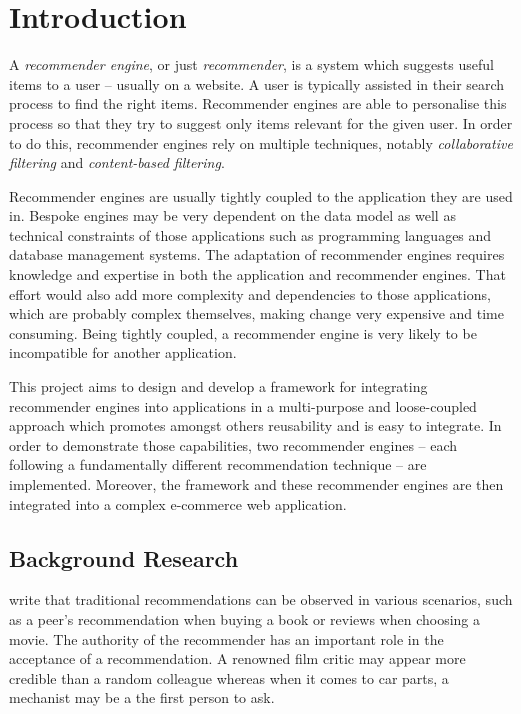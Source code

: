 \chapter{Introduction}

A \emph{recommender engine}, or just \emph{recommender}, is a system which suggests useful items to a user -- usually on a website. A user is typically assisted in their search process to find the right items. Recommender engines are able to personalise this process so that they try to suggest only items relevant for the given user. In order to do this, recommender engines rely on multiple techniques, notably \emph{collaborative filtering} and \emph{content-based filtering}.

Recommender engines are usually tightly coupled to the application they are used in. Bespoke  engines may be very dependent on the data model as well as technical constraints of those applications such as programming languages and database management systems. The adaptation of recommender engines requires knowledge and expertise in both the application and recommender engines. That effort would also add more complexity and dependencies to those applications, which are probably complex themselves, making change very expensive and time consuming. Being tightly coupled, a recommender engine is very likely to be incompatible for another application.

This project aims to design and develop a framework for integrating recommender engines into applications in a multi-purpose and loose-coupled approach which promotes amongst others reusability and is easy to integrate. In order to demonstrate those capabilities, two recommender engines -- each following a fundamentally different recommendation technique -- are implemented. Moreover, the framework and these recommender engines are then integrated into a complex e-commerce web application.

\section{Background Research}

\citet{ricci11} write that traditional recommendations can be observed in various scenarios, such as a peer's recommendation when buying a book or reviews when choosing a movie. The authority of the recommender has an important role in the acceptance of a recommendation. A renowned film critic may appear more credible than a random colleague whereas when it comes to car parts, a mechanist may be a the first person to ask.

